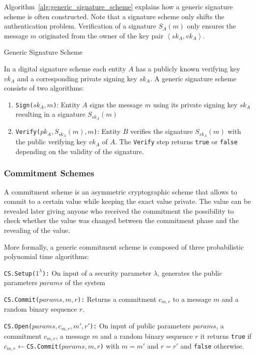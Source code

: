 Algorithm~\ref{alg:generic_signature_scheme} explains how a generic signature scheme is often constructed. Note that a signature scheme only shifts the authentication problem. Verification of a signature $S_A \left( m \right)$ only ensures the message $m$ originated from the owner of the key pair $\left< sk_A, vk_A \right>$.
\begin{algorithm}
\caption{Generic Signature Scheme }
\label{alg:generic_signature_scheme}
 \medskip
 In a digital signature scheme each entity $A$ has a publicly known verifying key $vk_A$ and a corresponding private signing key $sk_A$. A generic signature scheme consists of two algorithms:
 \begin{enumerate}
  \item \texttt{Sign($sk_A, m$)}: Entity $A$ signs the message $m$ using its private signing key $sk_A$ resulting in a signature $S_{sk_A} \left( m \right)$
  \item \texttt{Verify($pk_A, S_{sk_A} \left( m \right), m$)}: Entity $B$ verifies the signature $S_{sk_A} \left( m \right)$ with the public verifying key $vk_A$ of $A$. The \texttt{Verify} step returns \texttt{true} or \texttt{false} depending on the validity of the signature.
 \end{enumerate}
\end{algorithm}

\subsubsection{Commitment Schemes}
A commitment scheme is an asymmetric cryptographic scheme that allows to commit to a certain value while keeping the exact value private. The value can be revealed later giving anyone who received the commitment the possibility to check whether the value was changed between the commitment phase and the revealing of the value.

More formally, a generic commitment scheme is composed of three probabilistic polynomial time algorithms:

\begin{description}
 \item \texttt{CS.Setup($1^{\lambda}$):} On input of a security parameter $\lambda$, generates the public parameters $params$ of the system
 \item \texttt{CS.Commit($params, m, r$):} Returns a commitment $c_{m,r}$ to a message $m$ and a random binary sequence $r$.
 \item \texttt{CS.Open($params, c_{m,r}, m', r'$):} On input of public parameters $params$, a commitment $c_{m,r}$, a message $m$ and a random binary sequence $r$ it returns \texttt{true} if $c_{m,r} \leftarrow $\texttt{CS.Commit($params, m, r$)} with $m = m'$ and $r = r'$ and \texttt{false} otherwise.
\end{description}

